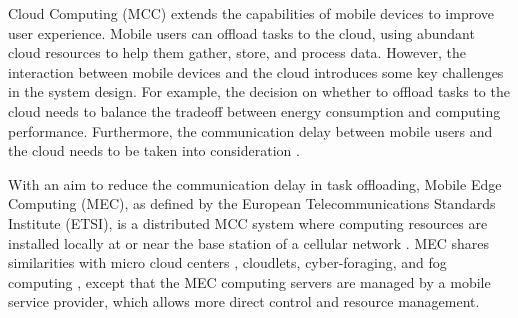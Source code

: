 \documentclass[10pt,journal,compsoc]{IEEEtran}
\begin{document}
%
\IEEEpeerreviewmaketitle








 Cloud Computing (MCC) extends the
capabilities of mobile devices to improve user
experience\cite{kumar2013}\cite{fernando2013}\cite{dinh2013}. Mobile users can
offload tasks to the cloud, using abundant cloud resources to help
them gather, store, and process data. However, the interaction
between mobile devices and the cloud introduces some key challenges
in the system design. For example, the decision on whether to offload tasks to the
cloud needs to balance the tradeoff between energy consumption and
computing performance. Furthermore, the communication delay between
mobile users and the cloud needs to be taken into consideration \cite{kumar2013}.



With an aim to reduce the communication delay in task offloading,
 Mobile Edge
Computing (MEC), as defined by the European Telecommunications
Standards Institute (ETSI), is a distributed MCC system where
computing resources are installed locally at or near the base
station of a cellular network
\cite{etsi2016framework}\cite{liang2017}\cite{tran2017}. MEC shares
similarities with micro cloud centers \cite{greenberg2008},
cloudlets\cite{satyanarayanan2009}, cyber-foraging\cite{lewis2015},
and fog computing \cite{bonomi2012}, except that the MEC computing
servers are managed by a mobile service provider, which allows more
direct control and resource management.
\end{document}
